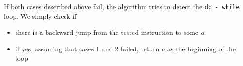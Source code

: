 \documentclass{article}
\begin{document}
If both cases described above fail, the algorithm tries to detect the \texttt{do - while} loop. We simply check if
\begin{itemize}
\item{there is a backward jump from the tested instruction to some \textit{a}}
\item{if yes, assuming that cases 1 and 2 failed, return \textit{a} as the beginning of the loop}
\end{itemize}
\end{document}
